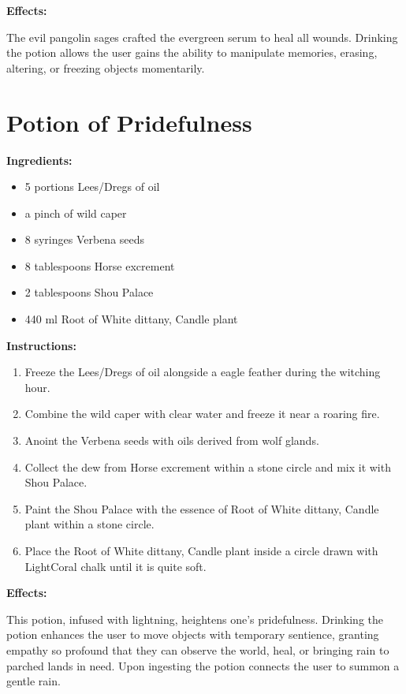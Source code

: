 \documentclass{article}
\begin{document}
\textbf{Effects:}

The evil pangolin sages crafted the evergreen serum to heal all wounds. Drinking the potion allows the user gains the ability to manipulate memories, erasing, altering, or freezing objects momentarily.

\newpage
\section*{Potion of Pridefulness}

\textbf{Ingredients:}

\begin{itemize}
  \item 5 portions Lees/Dregs of oil
  \item a pinch of wild caper
  \item 8 syringes Verbena seeds
  \item 8 tablespoons Horse excrement
  \item 2 tablespoons Shou Palace
  \item 440 ml Root of White dittany, Candle plant
\end{itemize}

\textbf{Instructions:}

\begin{enumerate}
  \item Freeze the Lees/Dregs of oil alongside a eagle feather during the witching hour.
  \item Combine the wild caper with clear water and freeze it near a roaring fire.
  \item Anoint the Verbena seeds with oils derived from wolf glands.
  \item Collect the dew from Horse excrement within a stone circle and mix it with Shou Palace.
  \item Paint the Shou Palace with the essence of Root of White dittany, Candle plant within a stone circle.
  \item Place the Root of White dittany, Candle plant inside a circle drawn with LightCoral chalk until it is quite soft.
\end{enumerate}

\textbf{Effects:}

This potion, infused with lightning, heightens one's pridefulness. Drinking the potion enhances the user to move objects with temporary sentience, granting empathy so profound that they can observe the world, heal, or bringing rain to parched lands in need. Upon ingesting the potion connects the user to summon a gentle rain.
\end{document}
